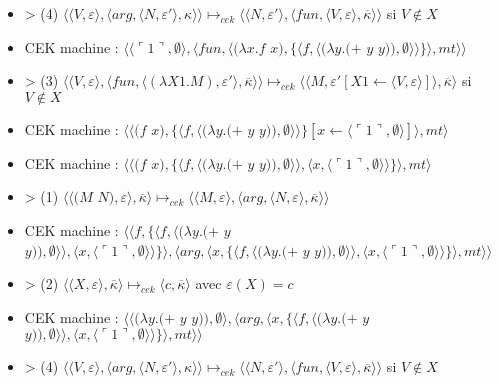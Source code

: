 \documentclass[10pt,a4paper]{article}
\begin{document}
\begin{itemize}
					\item[] > (4) $\langle \langle V,\varepsilon\rangle,\langle arg,\langle N,\varepsilon'\rangle,\kappa\rangle\rangle \longmapsto_{cek} \langle \langle N,\varepsilon'\rangle,\langle fun,\langle V,\varepsilon\rangle,\overline{\kappa}\rangle\rangle$ si $V \notin X$
					\item[] CEK machine : $\langle\langle\ulcorner 1\urcorner,\emptyset\rangle,\langle fun,\langle(\lambda x.f$ $x),\{\langle f,\langle(\lambda y.(+$ $y$ $y)),\emptyset\rangle\rangle\}\rangle,mt\rangle\rangle$
					\item[] > (3) $\langle\langle V,\varepsilon\rangle,\langle fun,\langle (\lambda X1.M),\varepsilon'\rangle,\overline{\kappa} \rangle \rangle \longmapsto_{cek} \langle \langle M,\varepsilon'[X1 \leftarrow \langle V,\varepsilon\rangle]\rangle,\overline{\kappa}\rangle$ si $V \notin X$
					\item[] CEK machine : $\langle\langle(f$ $x),\{\langle f,\langle(\lambda y.(+$ $y$ $y)),\emptyset\rangle\rangle\}[x \leftarrow \langle\ulcorner 1\urcorner,\emptyset\rangle]\rangle,mt\rangle$
					\item[] CEK machine : $\langle\langle(f$ $x),\{\langle f,\langle(\lambda y.(+$ $y$ $y)),\emptyset\rangle\rangle,\langle x,\langle\ulcorner 1\urcorner,\emptyset\rangle\rangle\}\rangle,mt\rangle$
					\item[] > (1) $\langle\langle(M$ $N),\varepsilon\rangle,\overline{\kappa}\rangle \longmapsto_{cek} \langle \langle M,\varepsilon\rangle,\langle arg,\langle N,\varepsilon\rangle,\overline{\kappa}\rangle\rangle$
					\item[] CEK machine : $\langle\langle f,\{\langle f,\langle(\lambda y.(+$ $y$ $y)),\emptyset\rangle\rangle,\langle x,\langle\ulcorner 1\urcorner,\emptyset\rangle\rangle\}\rangle,\langle arg,\langle x,\{\langle f,\langle(\lambda y.(+$ $y$ $y)),\emptyset\rangle\rangle,\langle x,\langle\ulcorner 1\urcorner,\emptyset\rangle\rangle\}\rangle,mt\rangle\rangle$
					\item[] > (2) $\langle\langle X,\varepsilon\rangle,\overline{\kappa}\rangle \longmapsto_{cek} \langle c,\overline{\kappa}\rangle$ avec $\varepsilon(X) = c$
					\item[] CEK machine : $\langle\langle(\lambda y.(+$ $y$ $y)),\emptyset\rangle,\langle arg,\langle x,\{\langle f,\langle(\lambda y.(+$ $y$ $y)),\emptyset\rangle\rangle,\langle x,\langle\ulcorner 1\urcorner,\emptyset\rangle\rangle\}\rangle,mt\rangle\rangle$
					\item[] > (4) $\langle \langle V,\varepsilon\rangle,\langle arg,\langle N,\varepsilon'\rangle,\kappa\rangle\rangle \longmapsto_{cek} \langle \langle N,\varepsilon'\rangle,\langle fun,\langle V,\varepsilon\rangle,\overline{\kappa}\rangle\rangle$ si $V \notin X$

\end{itemize}
\end{document}
